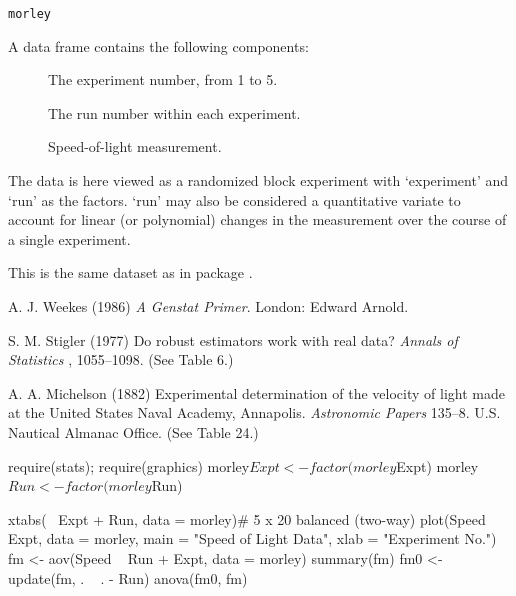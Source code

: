 %
\begin{Usage}
\begin{verbatim}
morley
\end{verbatim}
\end{Usage}
%
\begin{Format}
A data frame contains the following components:
\begin{description}

\item[] The experiment number, from 1 to 5.
\item[] The run number within each experiment.
\item[] Speed-of-light measurement.

\end{description}

\end{Format}
%
\begin{Details}\relax
The data is here viewed as a randomized block experiment with
`experiment' and `run' as the factors.  `run' may
also be considered a quantitative variate to account for linear (or
polynomial) changes in the measurement over the course of a single
experiment.
\end{Details}
%
\begin{Note}\relax
This is the same dataset as  in package .
\end{Note}
%
\begin{Source}\relax
A. J. Weekes (1986)
\emph{A Genstat Primer}.
London: Edward Arnold.

S. M. Stigler (1977)
Do robust estimators work with real data?
\emph{Annals of Statistics} , 1055--1098. (See Table 6.)

A. A. Michelson (1882)
Experimental determination of the velocity of light made at the United
States Naval Academy, Annapolis.
\emph{Astronomic Papers}  135--8.
U.S. Nautical Almanac Office.  (See Table 24.)
\end{Source}
%
\begin{Examples}
\begin{ExampleCode}
require(stats); require(graphics)
morley$Expt <- factor(morley$Expt)
morley$Run <- factor(morley$Run)

xtabs(~ Expt + Run, data = morley)# 5 x 20 balanced (two-way)
plot(Speed ~ Expt, data = morley,
     main = "Speed of Light Data", xlab = "Experiment No.")
fm <- aov(Speed ~ Run + Expt, data = morley)
summary(fm)
fm0 <- update(fm, . ~ . - Run)
anova(fm0, fm)
\end{ExampleCode}
\end{Examples}
